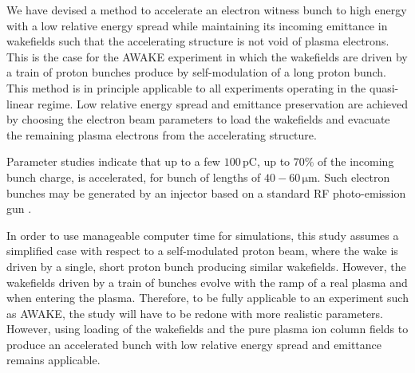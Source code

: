 \documentclass[aps,prstab,reprint,amsmath,amssymb,groupedaddress]{revtex4-1}
\newcommand{\unit}[1]{\,\mathrm{#1}}
\begin{document}


We have devised a method to accelerate an electron witness bunch to high energy with a low relative energy spread while
maintaining its incoming emittance in wakefields such that the accelerating structure is not void of plasma electrons.
This is the case for the AWAKE experiment in which the wakefields are driven by a train of proton bunches produce by
self-modulation of a long proton bunch. This method is in principle applicable to all experiments operating in the
quasi-linear regime. Low relative energy spread and emittance preservation are achieved by choosing the electron beam
parameters to load the wakefields and evacuate the remaining plasma electrons from the accelerating structure.
 
Parameter studies indicate that up to a few $100\unit{pC}$, up to $70\%$ of the incoming bunch charge, is accelerated,
for bunch of lengths of $40-60\unit{\mu m}$. Such electron bunches may be generated by an injector based on a standard
RF photo-emission gun \cite{doebert:corr}.

In order to use manageable computer time for simulations, this study assumes a simplified case with respect to a
self-modulated proton beam, where the wake is driven by a single, short proton bunch producing similar wakefields.
However, the wakefields driven by a train of bunches evolve with the ramp of a real plasma and when entering the plasma.
Therefore, to be fully applicable to an experiment such as AWAKE, the study will have to be redone with more realistic
parameters. However, using loading of the wakefields and the pure plasma ion column fields to produce an accelerated
bunch with low relative energy spread and emittance remains applicable.
\end{document}
